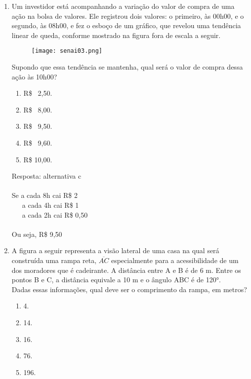 \documentclass[a4paper,14pt]{article}
\begin{document}
\begin{enumerate}
    	\item Um investidor está acompanhando a variação do valor de compra de uma ação na bolsa de valores. Ele
    	registrou dois valores: o primeiro, às 00h00, e o segundo, às 08h00, e fez o esboço de um gráfico, que
    	revelou uma tendência linear de queda, conforme mostrado na figura fora de escala a seguir. \\
   		\begin{figure}[h] %
    		\centering
    		\texttt{[image: senai03.png]} %
    	\end{figure}
    	Supondo que essa tendência se mantenha, qual será o valor de compra dessa ação às 10h00? \\
    	\begin{enumerate}
    		\item R\$ ~2,50.
    		\item R\$ ~8,00.
    		\item R\$ ~9,50.
    		\item R\$ ~9,60.
    		\item R\$ 10,00.
    	\end{enumerate}
    	Resposta: alternativa c \\
    	\\ 
    	Se a cada 8h cai R\$ 2 \\
    	~~~a cada 4h cai R\$ 1 \\
    	~~~a cada 2h cai R\$ 0,50 \\
    	\\
    	Ou seja, R\$ 9,50 
    	
    	\vspace{0cm}
    	
    	\item A figura a seguir representa a visão lateral de uma casa na qual será construída uma rampa reta, $\overline{AC}$
    	especialmente para a acessibilidade de um dos moradores que é cadeirante. A distância entre A e B é
    	de 6 m. Entre os pontos B e C, a distância equivale a 10 m e o ângulo ABC é de 120°. \\
    	

    	Dadas essas informações, qual deve ser o comprimento da rampa, em metros? \\
    	    
	   	\begin{enumerate}
    		\item 4.
    		\item 14.
    		\item 16.
    		\item 76.
    		\item 196.
    	\end{enumerate}
    

\end{enumerate}
\end{document}

